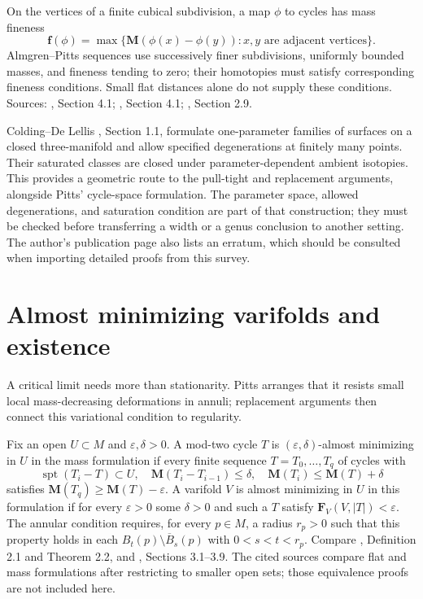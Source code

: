 \begin{definition}\label{def:mass-fineness}
On the vertices of a finite cubical subdivision, a map $\phi$ to cycles has mass fineness
\[
 \mathbf f(\phi)=\max\{\mathbf M(\phi(x)-\phi(y)):x,y\text{ are adjacent vertices}\}.
\]
Almgren--Pitts sequences use successively finer subdivisions, uniformly bounded masses, and fineness tending to zero; their homotopies must satisfy corresponding fineness conditions. Small flat distances alone do not supply these conditions. Sources: \cite{Pitts81}, Section 4.1; \cite{LiAP}, Section 4.1; \cite{LMN}, Section 2.9.
\end{definition}

\begin{remark}\label{rem:smooth-sweepouts}
Colding--De Lellis \cite{CDL}, Section 1.1, formulate one-parameter families of surfaces on a closed three-manifold and allow specified degenerations at finitely many points. Their saturated classes are closed under parameter-dependent ambient isotopies. This provides a geometric route to the pull-tight and replacement arguments, alongside Pitts' cycle-space formulation. The parameter space, allowed degenerations, and saturation condition are part of that construction; they must be checked before transferring a width or a genus conclusion to another setting. The author's publication page also lists an erratum, which should be consulted when importing detailed proofs from this survey.
\end{remark}

\chapter{Almost minimizing varifolds and existence}\label{sec:almost-minimizing}
A critical limit needs more than stationarity. Pitts arranges that it resists small local mass-decreasing deformations in annuli; replacement arguments then connect this variational condition to regularity.

\begin{definition}\label{def:almost-minimizing}
Fix an open $U\subset M$ and $\varepsilon,\delta>0$. A mod-two cycle $T$ is $(\varepsilon,\delta)$-almost minimizing in $U$ in the mass formulation if every finite sequence $T=T_0,\ldots,T_q$ of cycles with
\[
 \operatorname{spt}(T_i-T)\subset U,\quad
 \mathbf M(T_i-T_{i-1})\leq\delta,\quad
 \mathbf M(T_i)\leq\mathbf M(T)+\delta
\]
satisfies $\mathbf M(T_q)\geq\mathbf M(T)-\varepsilon$.
A varifold $V$ is almost minimizing in $U$ in this formulation if for every $\varepsilon>0$ some $\delta>0$ and such a $T$ satisfy $\mathbf F_V(V,|T|)<\varepsilon$.
The annular condition requires, for every $p\in M$, a radius $r_p>0$ such that this property holds in each $B_t(p)\setminus\overline B_s(p)$ with $0<s<t<r_p$. Compare \cite{LiAP}, Definition 2.1 and Theorem 2.2, and \cite{Pitts81}, Sections 3.1--3.9. The cited sources compare flat and mass formulations after restricting to smaller open sets; those equivalence proofs are not included here.
\end{definition}

